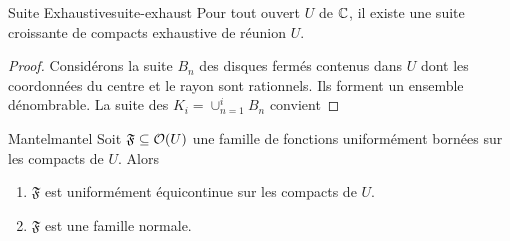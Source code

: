 \documentclass{cours}
\begin{document}
\begin{théorème}{Suite Exhaustive}{suite-exhaust}
	Pour tout ouvert $U$ de $\mathbb{C}$, il existe une suite croissante de compacts exhaustive de réunion $U$. 	
\end{théorème}
\begin{proof}
Considérons la suite $B_{n}$ des disques fermés contenus dans $U$ dont les coordonnées du centre et le rayon sont rationnels. Ils forment un ensemble dénombrable. La suite des $K_{i} = \cup_{n = 1}^{i} B_{n}$ convient
\end{proof}

\begin{théorème}{Mantel}{mantel}
	Soit $\mathfrak{F} \subseteq \mathcal{O}(U)$ une famille de fonctions uniformément bornées sur les compacts de $U$. Alors
	\begin{enumerate}
		\item $\mathfrak{F}$ est uniformément équicontinue sur les compacts de $U$. 
		\item $\mathfrak{F}$ est une famille normale. 
	\end{enumerate}
\end{théorème}
\end{document}
